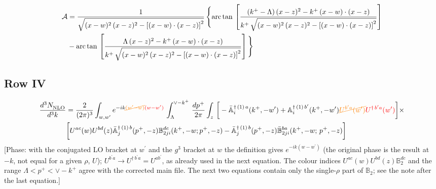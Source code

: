 \documentclass[9pt]{article}
\def\mf#1{\mathbb{#1}}
\numberwithin{equation}{section}
\begin{document}
\begin{align}
\mathcal{A} & = \frac{1}{\sqrt{(x-w)^{2}\,(x-z)^{2}-\left[(x-w)\cdot (x-z)\right]^{2}}}\, \Bigg\{\mathrm{arc\,tan}\,\left[\frac{(k^{+}-\Lambda)\,(x-z)^{2}-k^{+}\,(x-w)\cdot (x-z)}{k^{+}\,\sqrt{(x-w)^{2}\,(x-z)^{2}-\left[(x-w)\cdot (x-z)\right]^{2}}}\right]\notag \\ & - \mathrm{arc\,tan}\,\left[\frac{\Lambda\,(x-z)^{2}-k^{+}\,(x-w)\cdot (x-z)}{k^{+}\,\sqrt{(x-w)^{2}\,(x-z)^{2}-\left[(x-w)\cdot (x-z)\right]^{2}}}\right] \Bigg\} \nonumber
\end{align}
\subsection{Row IV\,}
\begin{align}
 \frac{d^{3}N_{\rm NLO}^{\rm}}{d^{3}k}  & = \frac{2}{(2\pi)^{3}}  \int_{w, w^\prime} e^{-ik{\color{orange}\cancel{(w^\prime-w)}}{\color{red}(w-w^\prime)}}\, \int_{\Lambda}^{\vee - k^{+}}\,\frac{dp^{+}}{2\pi} \int_{z}\,\bigg[-\bar{\mf{A}}^{\dagger\,(1)\,a}_{i}(k^{+},-w^{\prime})+\mf{A}^{\dagger\, (1)\, b^{\prime}}_{i}(k^{+},-w^{\prime}){\color{orange}\cancel{U^{b^{\prime}a}(w^{\prime})}}{\color{red}U^{\dagger\, b^{\prime}a}(w^{\prime})}\bigg]\times \notag \\ & \bigg[U^{ac}(w)U^{bd}(z) \bar{\mf{A}}^{\dagger\, (1)\, b}_{j}(p^+,- z) {\mf{B}}^{dc}_{2ji} (k^+, -w;p^+, -z) - \Bar{\mf{A}}^{\dagger\, (1)\, b}_{j}(p^{+}, -z)\Bar{\mf{B}}^{ba}_{2ji}(k^{+},-w;\,p^{+}, -z) \bigg] \nonumber
\end{align} {\color{red}[Phase: with the conjugated LO bracket at $w^\prime$ and the $g^3$ bracket at $w$ the definition gives $e^{-ik(w-w^\prime)}$ (the original phase is the result at $-k$, not equal for a given $\rho$, $U$); $U^{b^\prime a}\to U^{\dagger\, b^\prime a}=U^{ab^\prime}$, as already used in the next equation. The colour indices $U^{ac}(w)U^{bd}(z)\mf{B}_2^{dc}$ and the range $\Lambda<p^+<\vee-k^+$ agree with the corrected main file. The next two equations contain only the single-$\rho$ part of $\mf{B}_2$; see the note after the last equation.]}\par\noindent 
\end{document}
